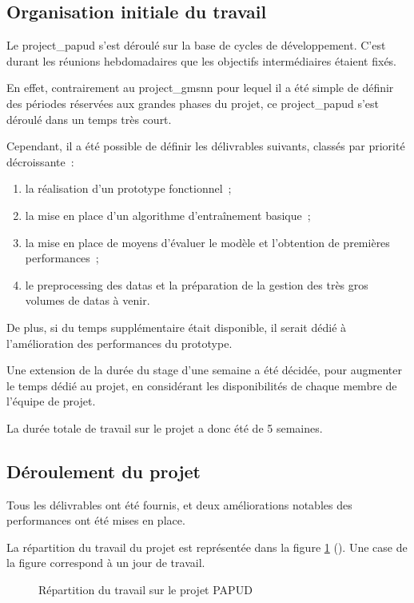 \pagebreak
\subsection{Organisation initiale du travail}
Le \gls{project_papud} s'est déroulé sur la base de cycles de développement.
C'est durant les réunions hebdomadaires que les objectifs intermédiaires étaient fixés.

En effet, contrairement au \gls{project_gmsnn} pour lequel il a été simple de définir des périodes réservées aux grandes phases du projet, ce \gls{project_papud} s'est déroulé dans un temps très court.

Cependant, il a été possible de définir les délivrables suivants, classés par priorité décroissante~:
\begin{enumerate}
	\item la réalisation d'un prototype fonctionnel~;
	\item la mise en place d'un algorithme d'entraînement basique~;
	\item la mise en place de moyens d'évaluer le modèle et l'obtention de premières performances~;
	\item le \gls{preprocessing} des \glspl{data} et la préparation de la gestion des très gros volumes de \glspl{data} à venir.
\end{enumerate}
\hspace{1em}
%
De plus, si du temps supplémentaire était disponible, il serait dédié à l'amélioration des performances du prototype.

Une extension de la durée du stage d'une semaine a été décidée, pour augmenter le temps dédié au projet, en considérant les disponibilités de chaque membre de l'équipe de projet.

La durée totale de travail sur le projet a donc été de 5 semaines.

\subsection{Déroulement du projet}
Tous les délivrables ont été fournis, et deux améliorations notables des performances ont été mises en place.

La répartition du travail du projet est représentée dans la figure \ref{fig:papud_time} (). Une case de la figure correspond à un jour de travail.

\begin{figure}[ht]
	\centering
	\caption[Répartition du travail sur le projet PAPUD]{Répartition du travail sur le projet PAPUD}\label{fig:papud_time}
\end{figure}

